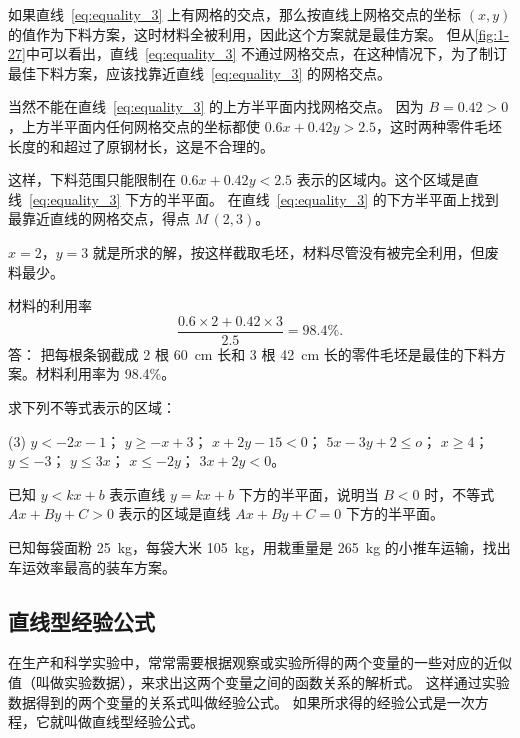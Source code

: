 \medskip
如果直线~\eqref{eq:equality_3} 上有网格的交点，那么按直线上网格交点的坐标 $(x,y)$ 的值作为下料方案，这时材料全被利用，因此这个方案就是最佳方案。
但从\cref{fig:1-27}中可以看出，直线~\eqref{eq:equality_3} 不通过网格交点，在这种情况下，为了制订最佳下料方案，应该找靠近直线~\eqref{eq:equality_3} 的网格交点。

当然不能在直线~\eqref{eq:equality_3} 的上方半平面内找网格交点。
因为 $B=0.42>0$，上方半平面内任何网格交点的坐标都使 $0.6x+0.42y>2.5$，这时两种零件毛坯长度的和超过了原钢材长，这是不合理的。

这样，下料范围只能限制在 $0.6x+0.42y<2.5$ 表示的区域内。这个区域是直线~\eqref{eq:equality_3} 下方的半平面。
在直线~\eqref{eq:equality_3} 的下方半平面上找到最靠近直线的网格交点，得点 $M\,(2,3)$。

$x=2$，$y=3$ 就是所求的解，按这样截取毛坯，材料尽管没有被完全利用，但废料最少。

材料的利用率
\[ \frac{0.6 \times 2 + 0.42 \times 3}{2.5} =98.4\%.\]
答： 把每根条钢截成 2 根 \qty{60}{cm} 长和 3 根 \qty{42}{cm} 长的零件毛坯是最佳的下料方案。材料利用率为 98.4\%。

\begin{Practice}
  \begin{question}
    \item 求下列不等式表示的区域：
    \begin{tasks}(3)
      \task $y<-2x-1$；
      \task $y\geqslant -x+3$；
      \task $x+2y-15<0$；
      \task $5x-3y+2\leqslant o$；
      \task $x\geqslant 4$；
      \task $y\leqslant -3$；
      \task $y\leqslant 3x$；
      \task $x\leqslant -2y$；
      \task $3x+2y<0$。
    \end{tasks}
    \item 已知 $y<kx+b$ 表示直线 $y=kx+b$ 下方的半平面，说明当 $B<0$ 时，不等式 $Ax+By+C>0$ 表示的区域是直线 $Ax+By+C=0$ 下方的半平面。
    \item 已知每袋面粉 \qty{25}{kg}，每袋大米 \qty{105}{kg}，用栽重量是 \qty{265}{kg} 的小推车运输，找出车运效率最高的装车方案。
  \end{question}
\end{Practice}

\subsection{直线型经验公式}
在生产和科学实验中，常常需要根据观察或实验所得的两个变量的一些对应的近似值（叫做实验数据），来求出这两个变量之间的函数关系的解析式。
这样通过实验数据得到的两个变量的关系式叫做经验公式。
如果所求得的经验公式是一次方程，它就叫做直线型经验公式。

